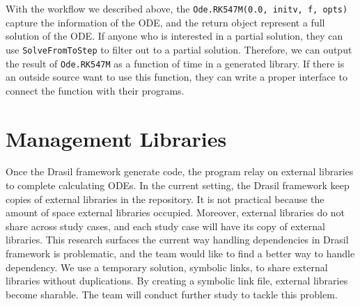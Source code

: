 With the workflow we described above, the \verb|Ode.RK547M(0.0, initv, f, opts)| capture the information of the ODE, and the return object represent a full solution of the ODE. If anyone who is interested in a partial solution, they can use \verb|SolveFromToStep| to filter out to a partial solution. Therefore,
we can output the result of \verb|Ode.RK547M| as a function of time in a generated library. If there is an outside source want to use this function, they can write a proper interface to connect the function with their programs. 

\section{Management Libraries}
Once the Drasil framework generate code, the program relay on external libraries to complete calculating ODEs. In the current setting, the Drasil framework keep copies of external libraries in the repository. It is not practical because the amount of space external libraries occupied. Moreover, external libraries do not share across study cases, and each study case will have its copy of external libraries. This research surfaces the current way handling dependencies in Drasil framework is problematic, and the team would like to find a better way to handle dependency. We use a temporary solution, symbolic links, to share external libraries without duplications. By creating a symbolic link file, external libraries become sharable. The team will conduct further study to tackle this problem.
